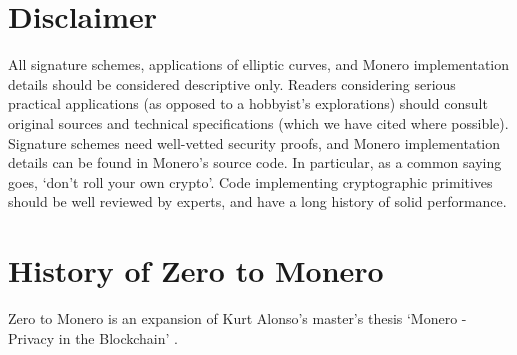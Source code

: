 \section{Disclaimer}

All signature schemes, applications of elliptic curves, and Monero implementation details should be considered descriptive only. Readers considering serious practical applications (as opposed to a hobbyist's explorations) should consult original sources and technical specifications (which we have cited where possible). Signature schemes need well-vetted security proofs, and Monero implementation details can be found in Monero's source code. In particular, as a common saying goes, `don't roll your own crypto'. Code implementing cryptographic primitives should be well reviewed by experts, and have a long history of solid performance.

\section{History of Zero to Monero}

Zero to Monero is an expansion of Kurt Alonso's master's thesis `Monero - Privacy in the Blockchain' \cite{kurt-original}.